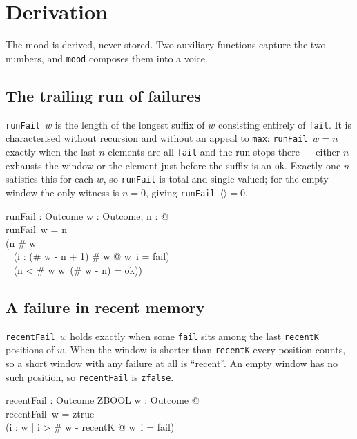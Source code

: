 \documentclass[a4paper,10pt,fleqn]{article}
\begin{document}
\section{Derivation}

The mood is derived, never stored. Two auxiliary functions capture the two
numbers, and \texttt{mood} composes them into a voice.

\subsection{The trailing run of failures}

\texttt{runFail}~$w$ is the length of the longest suffix of $w$ consisting
entirely of \texttt{fail}. It is characterised without recursion and without an
appeal to \texttt{max}: \texttt{runFail}~$w = n$ exactly when the last $n$
elements are all \texttt{fail} and the run stops there --- either $n$ exhausts
the window or the element just before the suffix is an \texttt{ok}. Exactly one
$n$ satisfies this for each $w$, so \texttt{runFail} is total and single-valued;
for the empty window the only witness is $n = 0$, giving
\texttt{runFail}~$\langle\rangle = 0$.

\begin{axdef}
  runFail : \seq Outcome \fun \nat
\where
  \forall w : \seq Outcome; n : \nat @ \\
  \quad runFail~w = n \iff \\
  \quad\quad (n \leq \# w \land \\
  \quad\quad~ (\forall i : (\# w - n + 1) \upto \# w @ w~i = fail) \land \\
  \quad\quad~ (n < \# w \implies w~(\# w - n) = ok))
\end{axdef}

\subsection{A failure in recent memory}

\texttt{recentFail}~$w$ holds exactly when some \texttt{fail} sits among the last
\texttt{recentK} positions of $w$. When the window is shorter than
\texttt{recentK} every position counts, so a short window with any failure at all
is ``recent''. An empty window has no such position, so \texttt{recentFail} is
\texttt{zfalse}.

\begin{axdef}
  recentFail : \seq Outcome \fun ZBOOL
\where
  \forall w : \seq Outcome @ \\
  \quad recentFail~w = ztrue \iff \\
  \quad\quad (\exists i : \dom w | i > \# w - recentK @ w~i = fail)
\end{axdef}
\end{document}
